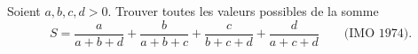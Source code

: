 Soient $a, b, c, d > 0$. Trouver toutes les valeurs possibles de la somme
\[ S = \frac{a}{a + b + d} + \frac{b}{a + b + c} + \frac{c}{b + c + d} + \frac{d}{a + c + d} \qquad \text{(IMO 1974).} \]
